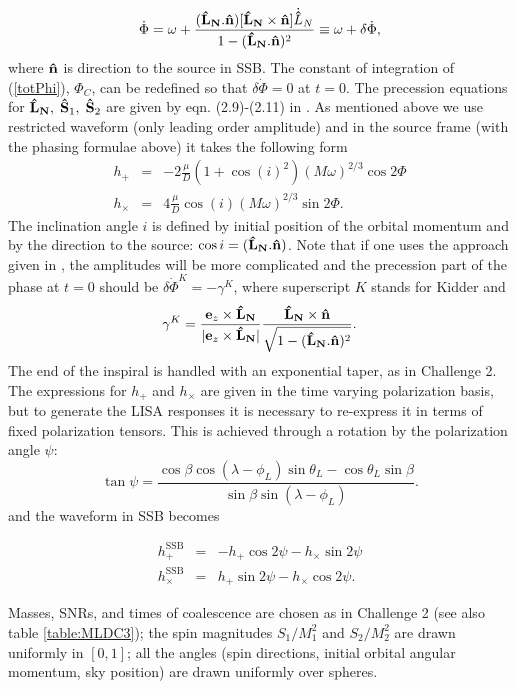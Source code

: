 \documentclass{iopart}
\def\bL{{\bf \hat{L}_{N}}}
\def\hn{{\bf {\hat n}}}
\begin{document}
\begin{equation}
\dot{\Phi} = \omega + \frac{(\bL.\hn)[\bL\times \hn]\dot{\bf \hat{L}}_N}{1-(\bL.\hn)^2}
\equiv \omega + \delta\dot{\Phi},\label{totPhi}
\end{equation}
where $\hn$ is direction to the source in SSB. The constant of integration of (\ref{totPhi}),
 $\Phi_C$,  can be redefined so that $\delta\dot{\Phi} = 0$ at $t=0$.  The precession  
 equations for $\bL, \; {\bf \hat{S}}_1,\;{\bf \hat{S}}_2$ are given by eqn. (2.9)-(2.11) in 
 \cite{LangHughes}. As mentioned above we use restricted waveform (only leading order amplitude) and in the source frame (with the phasing formulae above) it takes the following form 
 \begin{eqnarray}
h_{+} &=& -2\frac{\mu}{D}(1 + \cos(i)^2)(M\omega)^{2/3}\cos{2\Phi}\\
h_{\times} &=& 4\frac{\mu}{D}\cos(i)(M\omega)^{2/3}\sin{2\Phi}.
\end{eqnarray}
The inclination angle $i$ is defined by initial position of the orbital momentum and 
by the direction to the source: $\cos{i} = (\bL.\hn)$.
Note that if one uses the approach given in \cite{Kidder}, the amplitudes will be more complicated
and the precession part of the phase at $t=0$ should be $\delta\dot{\Phi}^K = -\gamma^K$,
where superscript $K$ stands for Kidder and 
$$
\gamma^K = \frac{{\bf e}_z \times \bL}{|{\bf e}_z \times \bL|}\frac{\bL\times \hn}
{\sqrt{1 - (\bL.\hn)^2}}.
$$
The end of the inspiral is handled with an exponential taper, as in Challenge 2. The expressions 
for $h_{+}$ and $h_{\times}$ are given in the time varying polarization basis, but to generate the LISA responses it is necessary to re-express it in terms
of fixed polarization tensors. This is achieved through a rotation by the polarization
angle $\psi$:
\begin{equation}
\tan{\psi} = \frac{\cos{\beta}\cos{(\lambda -\phi_L)}\sin{\theta_L} - \cos{\theta_L}\sin{\beta}}
{\sin{\beta}\sin{(\lambda - \phi_L)}}.
\end{equation}
and the waveform in SSB becomes

\begin{eqnarray}
h_{+}^\mathrm{SSB} &=& -h_{+}\cos{2\psi} - h_{\times}\sin{2\psi}\\
h_{\times}^\mathrm{SSB} &=& h_{+}\sin{2\psi} - h_{\times}\cos{2\psi}.
\end{eqnarray}

Masses, SNRs, and times of coalescence are chosen as in Challenge 2 (see also table \ref{table:MLDC3}); the spin magnitudes $S_1/M_1^2$ and $S_2/M_2^2$
are drawn uniformly in $[0,1]$; all the angles (spin directions, initial orbital angular momentum, sky position) are drawn uniformly over spheres.
\end{document}
